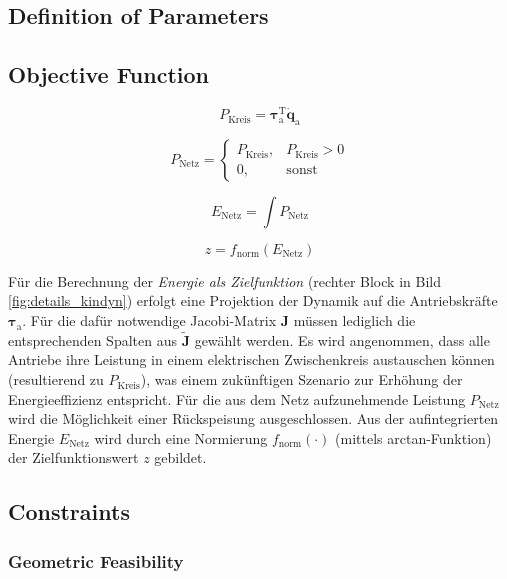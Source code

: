 \documentclass[fleqn,a4paper,10pt]{article}
\newcommand{\bm}[1]{\mathbf{#1}}
\newcommand{\transp}[0]{{\mathrm{T}}}
\begin{document}
\begin{multicols}{2}
\subsection{Definition of Parameters}

\subsection{Objective Function}


\begin{equation}
P_{\mathrm{Kreis}}=\bm{\tau}_\mathrm{a}^\transp \dot{\bm{q}}_\mathrm{a}
\end{equation}


\begin{equation}
P_{\mathrm{Netz}}=\left\{\begin{array}{ll} P_{\mathrm{Kreis}}, & P_{\mathrm{Kreis}}>0 \\0, & \mathrm{sonst}\end{array}\right.
\end{equation}

\begin{equation}
E_{\mathrm{Netz}}=\int{} P_{\mathrm{Netz}}
\end{equation}


\begin{equation}
z=f_\mathrm{norm}(E_{\mathrm{Netz}})
\end{equation}

Für die Berechnung der \emph{Energie als Zielfunktion} (rechter Block in Bild\,\ref{fig:details_kindyn}) erfolgt eine Projektion der Dynamik auf die Antriebskräfte $\bm{\tau}_\mathrm{a}$. 
Für die dafür notwendige Jacobi-Matrix $\bm{J}$ müssen lediglich die entsprechenden Spalten aus $\tilde{\bm{J}}$ gewählt werden.
Es wird angenommen, dass alle Antriebe ihre Leistung in einem elektrischen Zwischenkreis austauschen können (resultierend zu $P_\mathrm{Kreis}$), was einem zukünftigen Szenario zur Erhöhung der Energieeffizienz entspricht.
Für die aus dem Netz aufzunehmende Leistung $P_\mathrm{Netz}$ wird die Möglichkeit einer  Rückspeisung ausgeschlossen.
Aus der aufintegrierten Energie $E_\mathrm{Netz}$ wird durch eine Normierung $f_\mathrm{norm}(\cdot)$ (mittels arctan-Funktion) der Zielfunktionswert $z$ gebildet.


\subsection{Constraints}

\subsubsection{Geometric Feasibility}


\end{multicols}
\end{document}
